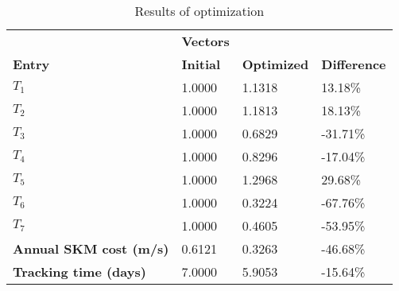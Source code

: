 \begin{table}[H]
\centering
\begin{tabular}{llll}
\textbf{}      & \cellcolor[HTML]{EFEFEF}\textbf{Vectors} & \textbf{} & \textbf{}         \\
\rowcolor[HTML]{EFEFEF} 
\textbf{Entry} & \textbf{Initial} & \textbf{Optimized} & \textbf{Difference} \\
$T_1$ & 1.0000 & 1.1318 & 13.18\% \\ 
$T_2$ & 1.0000 & 1.1813 & 18.13\% \\ 
$T_3$ & 1.0000 & 0.6829 & -31.71\% \\ 
$T_4$ & 1.0000 & 0.8296 & -17.04\% \\ 
$T_5$ & 1.0000 & 1.2968 & 29.68\% \\ 
$T_6$ & 1.0000 & 0.3224 & -67.76\% \\ 
$T_7$ & 1.0000 & 0.4605 & -53.95\% \\ 
\rowcolor[HTML]{EFEFEF} 
\textbf{Annual SKM cost (m/s)}  & 0.6121 & 0.3263 & -46.68\% \\ 
\rowcolor[HTML]{EFEFEF} 
\textbf{Tracking time (days)}  & 7.0000 & 5.9053 & -15.64\% \\ 
\end{tabular}
\caption{Results of optimization}
\label{tab:OptimizationAnalysis}
\end{table}